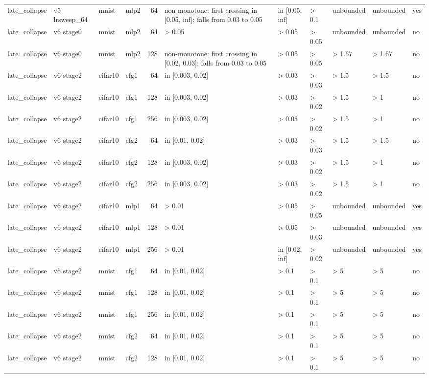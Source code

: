 \begin{table}[htbp]
{\begin{tabular}{@{}llllrllllll@{}}
late\_collapse & v5 lrsweep\_64 & mnist & mlp2 & 64 & non-monotone: first crossing in [0.05, inf]; falls from 0.03 to 0.05 & in [0.05, inf] & > 0.1 & unbounded & unbounded & yes \\
late\_collapse & v6 stage0 & mnist & mlp2 & 64 & > 0.05 & > 0.05 & > 0.05 & unbounded & unbounded & no \\
late\_collapse & v6 stage0 & mnist & mlp2 & 128 & non-monotone: first crossing in [0.02, 0.03]; falls from 0.03 to 0.05 & > 0.05 & > 0.05 & > 1.67 & > 1.67 & no \\
late\_collapse & v6 stage2 & cifar10 & cfg1 & 64 & in [0.003, 0.02] & > 0.03 & > 0.03 & > 1.5 & > 1.5 & no \\
late\_collapse & v6 stage2 & cifar10 & cfg1 & 128 & in [0.003, 0.02] & > 0.03 & > 0.02 & > 1.5 & > 1 & no \\
late\_collapse & v6 stage2 & cifar10 & cfg1 & 256 & in [0.003, 0.02] & > 0.03 & > 0.02 & > 1.5 & > 1 & no \\
late\_collapse & v6 stage2 & cifar10 & cfg2 & 64 & in [0.01, 0.02] & > 0.03 & > 0.03 & > 1.5 & > 1.5 & no \\
late\_collapse & v6 stage2 & cifar10 & cfg2 & 128 & in [0.003, 0.02] & > 0.03 & > 0.02 & > 1.5 & > 1 & no \\
late\_collapse & v6 stage2 & cifar10 & cfg2 & 256 & in [0.003, 0.02] & > 0.03 & > 0.02 & > 1.5 & > 1 & no \\
late\_collapse & v6 stage2 & cifar10 & mlp1 & 64 & > 0.01 & > 0.05 & > 0.05 & unbounded & unbounded & yes \\
late\_collapse & v6 stage2 & cifar10 & mlp1 & 128 & > 0.01 & > 0.05 & > 0.03 & unbounded & unbounded & yes \\
late\_collapse & v6 stage2 & cifar10 & mlp1 & 256 & > 0.01 & in [0.02, inf] & > 0.02 & unbounded & unbounded & yes \\
late\_collapse & v6 stage2 & mnist & cfg1 & 64 & in [0.01, 0.02] & > 0.1 & > 0.1 & > 5 & > 5 & no \\
late\_collapse & v6 stage2 & mnist & cfg1 & 128 & in [0.01, 0.02] & > 0.1 & > 0.1 & > 5 & > 5 & no \\
late\_collapse & v6 stage2 & mnist & cfg1 & 256 & in [0.01, 0.02] & > 0.1 & > 0.1 & > 5 & > 5 & no \\
late\_collapse & v6 stage2 & mnist & cfg2 & 64 & in [0.01, 0.02] & > 0.1 & > 0.1 & > 5 & > 5 & no \\
late\_collapse & v6 stage2 & mnist & cfg2 & 128 & in [0.01, 0.02] & > 0.1 & > 0.1 & > 5 & > 5 & no \\

\end{tabular}}
\end{table}
